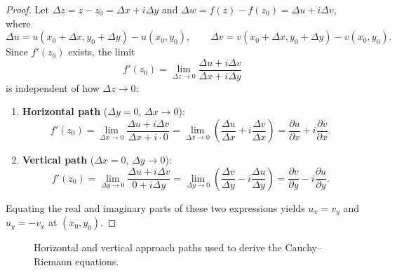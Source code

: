 \documentclass[11pt,a4paper]{article}
\theoremstyle{definitionbreak}
\theoremstyle{examplebreak}
\theoremstyle{theorembreak}
\begin{document}
\begin{proof}
Let $\Delta z = z - z_0 = \Delta x + i\Delta y$ and $\Delta w = f(z) - f(z_0) = \Delta u + i\Delta v$, where
\[
    \Delta u = u(x_0 + \Delta x, y_0 + \Delta y) - u(x_0, y_0), \qquad \Delta v = v(x_0 + \Delta x, y_0 + \Delta y) - v(x_0, y_0).
\]
Since $f'(z_0)$ exists, the limit
\[
    f'(z_0) = \lim_{\Delta z \to 0} \frac{\Delta u + i\Delta v}{\Delta x + i\Delta y}
\]
is independent of how $\Delta z \to 0$:
\begin{enumerate}
    \item \textbf{Horizontal path} ($\Delta y = 0$, $\Delta x \to 0$):
    \[
        f'(z_0) = \lim_{\Delta x \to 0} \frac{\Delta u + i\Delta v}{\Delta x + i\cdot 0} = \lim_{\Delta x \to 0} \left(\frac{\Delta u}{\Delta x} + i\frac{\Delta v}{\Delta x}\right) = \frac{\partial u}{\partial x} + i\frac{\partial v}{\partial x}.
    \]
    \item \textbf{Vertical path} ($\Delta x = 0$, $\Delta y \to 0$):
    \[
        f'(z_0) = \lim_{\Delta y \to 0} \frac{\Delta u + i\Delta v}{0 + i\Delta y} = \lim_{\Delta y \to 0} \left(\frac{\Delta v}{\Delta y} - i\frac{\Delta u}{\Delta y}\right) = \frac{\partial v}{\partial y} - i\frac{\partial u}{\partial y}.
    \]
\end{enumerate}
Equating the real and imaginary parts of these two expressions yields $u_x = v_y$ and $u_y = -v_x$ at $(x_0, y_0)$.
\end{proof}

\begin{figure}[H]
\centering
\begingroup
\linespread{1.0}\selectfont
{}
\caption{Horizontal and vertical approach paths used to derive the Cauchy--Riemann equations.}
\endgroup
\end{figure}
\end{document}
